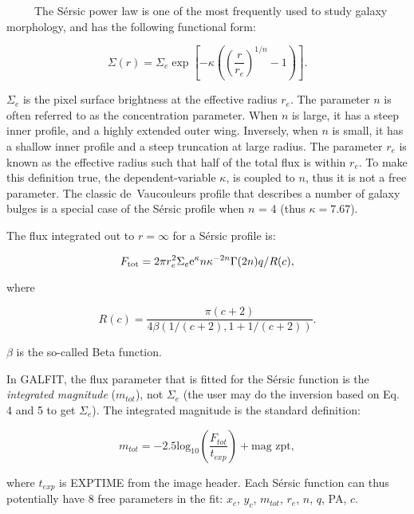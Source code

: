 \documentclass[preprint]{aastex}
\begin{document}
\bigskip
{}\ \ \ \ \ The S\'ersic power law is one of
the most frequently used to study galaxy morphology, and has the following
functional form:

\begin {equation}
\Sigma(r)=\Sigma_e \exp{\left[-\kappa \left(\left({\frac{r}{r_e}}\right)^{1/n} - 1\right)\right]}.
\end {equation}

\noindent $\Sigma_e$ is the pixel surface brightness at the effective radius
$r_e$.  The parameter $n$ is often referred to as the concentration parameter.
When $n$ is large, it has a steep inner profile, and a highly extended outer
wing.  Inversely, when $n$ is small, it has a shallow inner profile and a
steep truncation at large radius.  The parameter $r_e$ is known as the
effective radius such that half of the total flux is within $r_e$.  To make
this definition true, the dependent-variable $\kappa$, is coupled to $n$, thus
it is not a free parameter.  The classic de~Vaucouleurs profile that describes
a number of galaxy bulges is a special case of the S\'ersic profile when $n$ =
4 (thus $\kappa = 7.67$).

The flux integrated out to $r=\infty$ for a S\'ersic profile is:

\begin{equation} 
F_{\rm tot} = 2\pi r_e^2 \Sigma_e {\mbox e}^\kappa n \kappa^{-2n}\Gamma(2n) q/R(c),
\end{equation}

\noindent where

\begin{equation}
R(c) = {\frac{\pi (c+2)} {4 \beta (1/(c+2), 1+1/(c+2))}}.
\end{equation}

\noindent $\beta$ is the so-called Beta function.

In GALFIT, the flux parameter that is fitted for the S\'ersic function is the
{\it integrated magnitude} ($m_{tot}$), not $\Sigma_e$ (the user may do the
inversion based on Eq. 4 and 5 to get $\Sigma_e$).  The integrated magnitude
is the standard definition:

\begin {equation}
m_{tot} = -2.5  {\mbox {log}_{10}} \left( \frac{F_{tot}}{t_{exp}}\right) + {\mbox {mag zpt}},
\end {equation}

\noindent where $t_{exp}$ is EXPTIME from the image header.  Each S\'ersic
function can thus potentially have 8 free parameters in the fit:  $x_c$,
$y_c$, $m_{tot}$, $r_e$, $n$, $q$, PA, $c$.
\end{document}
